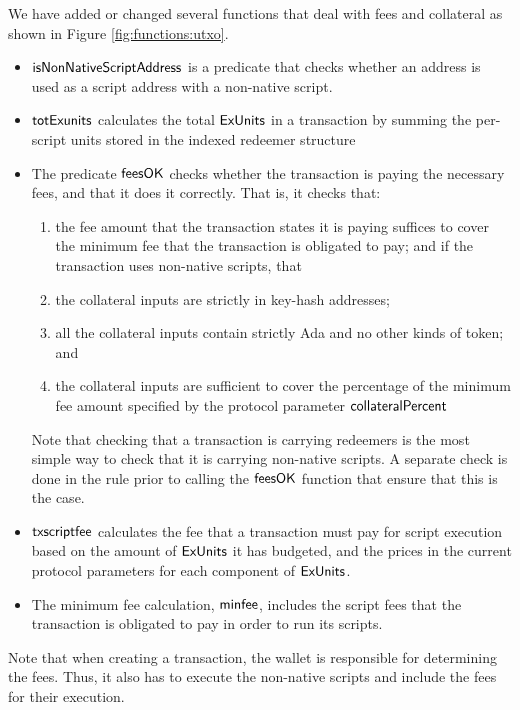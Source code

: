 We have added or changed several functions that deal with fees and collateral as shown in Figure \ref{fig:functions:utxo}.

\begin{itemize}
  \item $\mathsf{isNonNativeScriptAddress}$ is a predicate that checks
  whether an address is used as a script address with a non-native
  script.
  \item $\mathsf{totExunits}$ calculates the total $\mathsf{ExUnits}$ in a transaction by summing
  the per-script units stored in the indexed redeemer structure
  \item The predicate $\mathsf{feesOK}$ checks whether the transaction is
  paying the necessary fees, and that it does it correctly. That is, it checks that:
  \begin{enumerate}[label=({\roman*})]
    \item the fee amount that the transaction states it is paying suffices to cover
    the minimum fee that the transaction is obligated to pay; and if the transaction uses non-native scripts, that
    \item the collateral inputs are strictly in key-hash addresses;
    \item all the collateral inputs contain strictly Ada and no other kinds of token; and
    \item the collateral inputs are sufficient to cover the percentage of the
    minimum fee amount specified by the protocol parameter $\mathsf{collateralPercent}$
  \end{enumerate}
  Note that checking that a transaction is carrying redeemers is the most simple way to
  check that it is carrying non-native scripts. A separate check is done in the rule prior to
  calling the $\mathsf{feesOK}$ function that ensure that this is the case.
  \item $\mathsf{txscriptfee}$ calculates the fee that a transaction must pay for script
  execution based on the amount of $\mathsf{ExUnits}$ it has budgeted, and the prices in the current protocol parameters
  for each component of $\mathsf{ExUnits}$.
  \item The minimum fee calculation, $\mathsf{minfee}$, includes the script
  fees that the transaction is obligated to pay in order to run its scripts.
\end{itemize}

Note that when creating a transaction, the wallet is responsible for
determining the fees. Thus, it also has to execute the non-native scripts
and include the fees for their execution.

